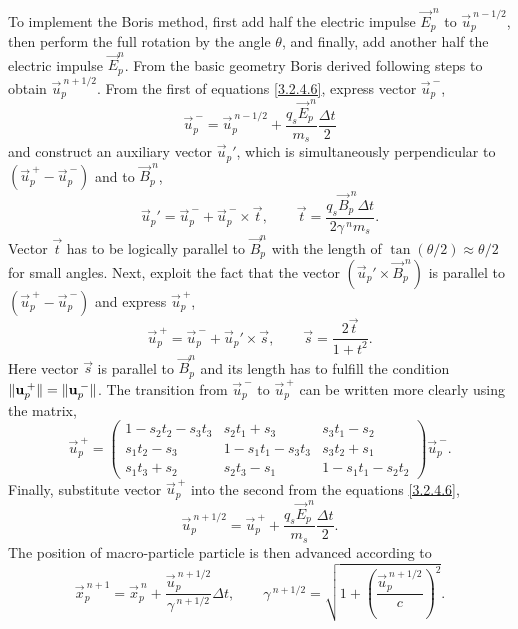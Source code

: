 To implement the Boris method, first add half the electric impulse $ \vec{E}_{p}^{\:n} $ to $ \vec{u}_{p}^{\:n-1/2} $, then perform the full rotation by the angle $ \theta $, and finally, add another half the electric impulse $ \vec{E}_{p}^{n} $. From the basic geometry Boris derived following steps to obtain $ \vec{u}_{p}^{\:n + 1/2} $. From the first of equations \ref{3.2.4.6}, express vector $ \vec{u}_{p}^{\:-} $,
\begin{equation}
\vec{u}_{p}^{\:-} = \vec{u}_{p}^{\:n-1/2} +  \frac{q_{s} \vec{E}_{p}^{\:n}}{m_{s}} \frac{\Delta t}{2}
\end{equation}
and construct an auxiliary vector $ \vec{u}_{p}\!' $, which is simultaneously perpendicular to $ \left(\vec{u}_{p}^{\:+} - \vec{u}_{p}^{\:-} \right) $ and to $ \vec{B}_{p}^{\:n} $,
\begin{equation}
\vec{u}_{p}\!' = \vec{u}_{p}^{\:-} + \vec{u}_{p}^{\:-} \times \vec{t}, \qquad \vec{t} = \frac{q_{s} \vec{B}_{p}^{\:n} \Delta t}{2 \gamma^{\:n} m_{s}}.
\end{equation}
Vector $ \vec{t} $ has to be logically parallel to $ \vec{B}_{p}^{n} $ with the length of $ \tan \left(\theta/2\right) \approx \theta/2 $ for small angles. Next, exploit the fact that the vector $ (\vec{u}_{p}\!' \times \vec{B}_{p}^{\:n}) $ is parallel to $ \left(\vec{u}_{p}^{\:+} - \vec{u}_{p}^{\:-} \right) $ and express $ \vec{u}_{p}^{\:+} $,
\begin{equation}
\vec{u}_{p}^{\:+} = \vec{u}_{p}^{\:-} + \vec{u}_{p}\!' \times \vec{s}, \qquad \vec{s} = \frac{2\vec{t}}{1 + t^2}.
\end{equation}
Here vector $ \vec{s} $ is parallel to $ \vec{B}_{p}^{n} $ and its length has to fulfill the condition $ \lVert\mathbf{u}_{p}^{\:+}\rVert = \lVert\mathbf{u}_{p}^{\:-}\rVert $. The transition from $ \vec{u}_{p}^{\:-} $ to $ \vec{u}_{p}^{\:+} $ can be written more clearly using the matrix,
\begingroup
\renewcommand*{\arraystretch}{1.8}
\begin{equation}
\vec{u}_{p}^{\:+} =  \begin{pmatrix}
  1 - s_{2}t_{2} - s_{3}t_{3} & s_{2}t_{1} + s_{3} & s_{3}t_{1} - s_{2} \\
  s_{1}t_{2} - s_{3} & 1 - s_{1}t_{1} - s_{3}t_{3} & s_{3}t_{2} + s_{1} \\
  s_{1}t_{3} + s_{2} & s_{2}t_{3} - s_{1} & 1 - s_{1}t_{1} - s_{2}t_{2}
 \end{pmatrix}
\vec{u}_{p}^{\:-}.
\end{equation}
\endgroup
Finally, substitute vector $ \vec{u}_{p}^{\:+} $ into the second from the equations \ref{3.2.4.6},
\begin{equation}
\vec{u}_{p}^{\:n+1/2} = \vec{u}_{p}^{\:+} + \frac{q_{s} \vec{E}_{p}^{\:n}}{m_{s}} \frac{\Delta t}{2}.
\end{equation}
The position of macro-particle particle is then advanced according to
\begin{equation}
\vec{x}_{p}^{\:n+1} = \vec{x}_{p}^{\:n} + \frac{\vec{u}_{p}^{\:n + 1/2}}{\gamma^{\:n + 1/2}} \Delta t, \qquad \gamma^{\:n + 1/2} = \sqrt{1 + \left(\frac{\vec{u}_{p}^{\:n + 1/2}}{c}\right)^{2}}.
\end{equation}


